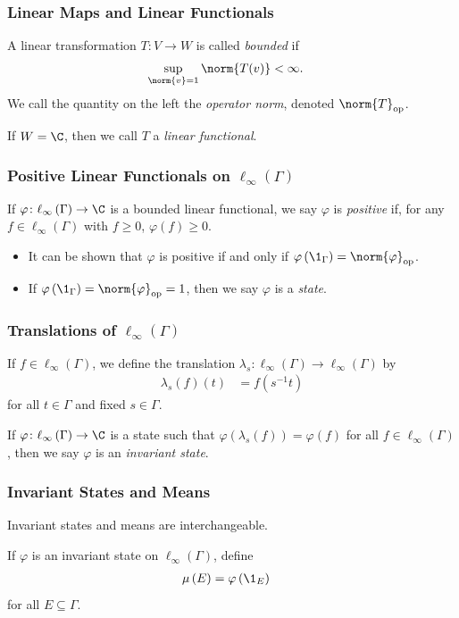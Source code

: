 \documentclass{beamer-custom}
\DeclareMathOperator{\op}{op}
\begin{document}
\begin{frame}
  \frametitle{Linear Maps and Linear Functionals}
  A linear transformation $T\colon V\rightarrow W$ is called \textit{bounded} if
  \begin{align*}
    \sup_{\norm{v}=1}\norm{T(v)} &< \infty.
  \end{align*}\pause
  We call the quantity on the left the \textit{operator norm}, denoted $\norm{T}_{\op}$.\newline

  If $W = \C$, then we call $T$ a \textit{linear functional}.
\end{frame}
\begin{frame}
  \frametitle{Positive Linear Functionals on $\ell_{\infty}\left( \Gamma \right)$}
  If $\varphi\colon \ell_{\infty}\left( \Gamma \right)\rightarrow \C$ is a bounded linear functional, we say $\varphi $ is \textit{positive} if, for any $f\in \ell_{\infty}\left( \Gamma \right)$ with $f \geq 0$, $\varphi(f)\geq 0$.
  \begin{itemize}
    \item It can be shown that $\varphi$ is positive if and only if $\varphi\left( \1_{\Gamma} \right) = \norm{\varphi}_{\op}$.
    \item If $\varphi\left( \1_{\Gamma} \right) = \norm{\varphi}_{\op} = 1$, then we say $\varphi$ is a \textit{state}.
  \end{itemize}
\end{frame}
\begin{frame}
  \frametitle{Translations of $\ell_{\infty}\left( \Gamma \right)$}
  If $f\in \ell_{\infty}\left( \Gamma \right)$, we define the translation $\lambda_s\colon \ell_{\infty}\left( \Gamma \right)\rightarrow \ell_{\infty}\left( \Gamma \right)$ by
  \begin{align*}
    \lambda_s(f)(t) &= f\left( s^{-1}t \right)
  \end{align*}
  for all $t\in \Gamma$ and fixed $s\in\Gamma$.\newline

  If $\varphi\colon \ell_{\infty}\left( \Gamma \right)\rightarrow \C$ is a state such that $\varphi\left( \lambda_s(f) \right) = \varphi(f)$ for all $f\in \ell_{\infty}\left( \Gamma \right)$, then we say $\varphi$ is an \textit{invariant state}.
\end{frame}
\begin{frame}
  \frametitle{Invariant States and Means}
  Invariant states and means are interchangeable.\pause\newline

  If $\varphi$ is an invariant state on $\ell_{\infty}\left( \Gamma \right)$, define
  \begin{align*}
    \mu\left( E \right) &= \varphi\left( \1_{E} \right)
  \end{align*}
  for all $E\subseteq \Gamma$.
\end{frame}
\end{document}
